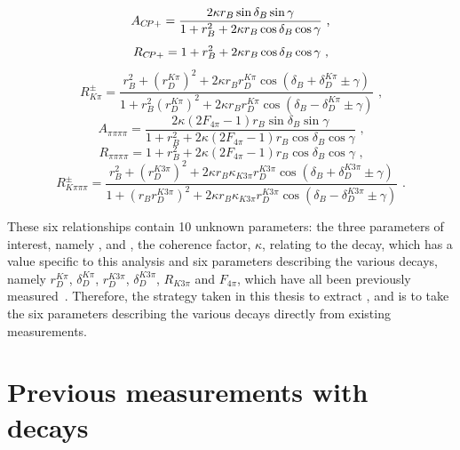 \begin{equation}
A_{{C\!P}+} = \frac{2 \kappa r_B\sin\delta_B\sin\gamma}{1 + r_B^2 + 2 \kappa r_B\cos\delta_B\cos\gamma} \text{ ,}
\label{exp_Acp}
\end{equation}
\begin{equation}
R_{{C\!P}+} = 1 + r_B^2 + 2 \kappa r_B\cos\delta_B\cos\gamma \text{ ,}
\label{exp_Rcp}
\end{equation}
\begin{equation}
R^{\pm}_{K\pi} = \frac{r_B^2 + \left(r_D^{K\pi}\right)^2 + 2\kappa r_B r_D^{K\pi} \cos(\delta_B + \delta_D^{K\pi} \pm \gamma)}{1 + r_B^2\left(r_D^{K\pi}\right)^2 + 2\kappa r_B r_D^{K\pi} \cos(\delta_B - \delta_D^{K\pi} \pm \gamma)} \text{ ,}
\label{exp_Rpm}
\end{equation}
\begin{equation}
A_{\pi\pi\pi\pi} = \frac{2 \kappa\left(2F_{4\pi} - 1\right) r_B\sin\delta_B\sin\gamma}{1 + r_B^2 + 2 \kappa\left(2F_{4\pi} - 1\right) r_B\cos\delta_B\cos\gamma} \text{ ,}
\label{exp_A4pi}
\end{equation}
\begin{equation}
R_{\pi\pi\pi\pi} = 1 + r_B^2 + 2 \kappa\left(2F_{4\pi} - 1\right) r_B\cos\delta_B\cos\gamma \text{ ,}
\label{exp_R4pi}
\end{equation}
\begin{equation}
R^{\pm}_{K\pi\pi\pi} = \frac{r_B^2 + \left(r_D^{K3\pi}\right)^2 + 2\kappa r_B \kappa_{K3\pi} r_D^{K3\pi} \cos(\delta_B + \delta_D^{K3\pi} \pm \gamma)}{1 + \left(r_Br_D^{K3\pi}\right)^2 + 2\kappa r_B \kappa_{K3\pi} r_D^{K3\pi} \cos(\delta_B - \delta_D^{K3\pi} \pm \gamma)} \text{ .}
\label{exp_Rpm4body}
\end{equation}

These six relationships contain 10 unknown parameters: the three parameters of interest, namely \rb, \deltab and \Pgamma, the coherence factor, $\kappa$, relating to the \Bm decay, which has a value specific to this analysis and six parameters describing the various \Dz decays, namely $r_D^{K\pi}$, $\delta_D^{K\pi}$, $r_D^{K3\pi}$, $\delta_D^{K3\pi}$, $R_{K3\pi}$ and $F_{4\pi}$, which have all been previously measured~\cite{charm4pi,charmk3pi,LHCb-PAPER-2015-057}. Therefore, the strategy taken in this thesis to extract \rb, \deltab and \Pgamma is to take the six parameters describing the various \Dz decays directly from existing measurements.


\section{Previous \Pgamma measurements with  decays}

